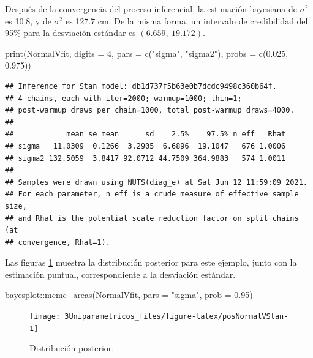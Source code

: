 \documentclass[
  10pt,
  spanish,
]{book}
\newenvironment{Shaded}{\begin{snugshade}}{\end{snugshade}}
\newcommand{\AttributeTok}[1]{\textcolor[rgb]{0.77,0.63,0.00}{#1}}
\newcommand{\DecValTok}[1]{\textcolor[rgb]{0.00,0.00,0.81}{#1}}
\newcommand{\FloatTok}[1]{\textcolor[rgb]{0.00,0.00,0.81}{#1}}
\newcommand{\FunctionTok}[1]{\textcolor[rgb]{0.00,0.00,0.00}{#1}}
\newcommand{\NormalTok}[1]{#1}
\newcommand{\SpecialCharTok}[1]{\textcolor[rgb]{0.00,0.00,0.00}{#1}}
\newcommand{\StringTok}[1]{\textcolor[rgb]{0.31,0.60,0.02}{#1}}
\theoremstyle{definition}
\theoremstyle{definition}
\theoremstyle{definition}
\theoremstyle{definition}
\theoremstyle{remark}
\begin{document}
Después de la convergencia del proceso inferencial, la estimación bayesiana de \(\sigma^2\) es 10.8, y de \(\sigma^2\) es 127.7 cm. De la misma forma, un intervalo de credibilidad del 95\% para la desviación estándar es \((6.659,\ 19.172)\).

\begin{Shaded}
\begin{Highlighting}[]
\FunctionTok{print}\NormalTok{(NormalVfit, }\AttributeTok{digits =} \DecValTok{4}\NormalTok{, }
      \AttributeTok{pars =} \FunctionTok{c}\NormalTok{(}\StringTok{"sigma"}\NormalTok{, }\StringTok{"sigma2"}\NormalTok{), }\AttributeTok{probs =} \FunctionTok{c}\NormalTok{(}\FloatTok{0.025}\NormalTok{, }\FloatTok{0.975}\NormalTok{))}
\end{Highlighting}
\end{Shaded}

\begin{verbatim}
## Inference for Stan model: db1d737f5b63e0b7dcdc9498c360b64f.
## 4 chains, each with iter=2000; warmup=1000; thin=1; 
## post-warmup draws per chain=1000, total post-warmup draws=4000.
## 
##            mean se_mean      sd    2.5%    97.5% n_eff   Rhat
## sigma   11.0309  0.1266  3.2905  6.6896  19.1047   676 1.0006
## sigma2 132.5059  3.8417 92.0712 44.7509 364.9883   574 1.0011
## 
## Samples were drawn using NUTS(diag_e) at Sat Jun 12 11:59:09 2021.
## For each parameter, n_eff is a crude measure of effective sample size,
## and Rhat is the potential scale reduction factor on split chains (at 
## convergence, Rhat=1).
\end{verbatim}

Las figuras \ref{fig:posNormalVStan} muestra la distribución posterior para este ejemplo, junto con la estimación puntual, correspondiente a la desviación estándar.

\begin{Shaded}
\begin{Highlighting}[]
\NormalTok{bayesplot}\SpecialCharTok{::}\FunctionTok{mcmc\_areas}\NormalTok{(NormalVfit, }\AttributeTok{pars =} \StringTok{"sigma"}\NormalTok{, }
                      \AttributeTok{prob =} \FloatTok{0.95}\NormalTok{)}
\end{Highlighting}
\end{Shaded}

\begin{figure}

{\centering \texttt{[image: 3Uniparametricos\_files/figure-latex/posNormalVStan-1]} 

}

\caption{Distribución posterior.}\label{fig:posNormalVStan}
\end{figure}
\end{document}
